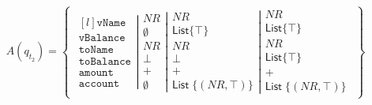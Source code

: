 \begin{align}
    A(q_{t_2})=\left\{\begin{matrix}
                          \left.\begin{matrix*}[l]
                                    \texttt{vName}\\
                                    \texttt{vBalance}\\
                                    \texttt{toName}\\
                                    \texttt{toBalance}\\
                                    \texttt{amount}\\
                                    \texttt{account}
                          \end{matrix*}\right|
                          \left.\begin{matrix}
                                    NR\\
                                    \emptyset\\
                                    NR\\
                                    \bot\\
                                    +\\
                                    \emptyset
                          \end{matrix}\right|
                          \left.\begin{matrix}
                                    NR\\
                                    \mathsf{List} \{\top\}\\
                                    NR\\
                                    \bot\\
                                    +\\
                                    \mathsf{List} \; \{(NR, \top)\}
                          \end{matrix}\right|
                          \begin{matrix}
                              NR\\
                              \mathsf{List} \{\top\}\\
                              NR\\
                              \mathsf{List} \{\top\}\\
                              +\\
                              \mathsf{List} \; \{(NR, \top)\}
                          \end{matrix}
    \end{matrix}\right\}
\end{align}


